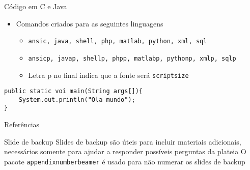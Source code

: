 \documentclass{beamer}
\let\olditem\item
\renewcommand{\item}{%
\olditem\vspace{\fill}}
\begin{document}
\begin{frame}[fragile]{Código em C e Java}

\begin{itemize}
		\item Comandos criados para as seguintes linguagens
		\begin{itemize}
			\item \texttt{ansic, java, shell, php, matlab, python, xml, sql}
			\item \texttt{ansicp, javap, shellp, phpp, matlabp, pythonp, xmlp, sqlp}
			\item Letra p no final indica que a fonte será \texttt{scriptsize}
		\end{itemize}
\end{itemize}



\javap
\begin{lstlisting}
public static voi main(String args[]){
	System.out.println("Ola mundo");
}
\end{lstlisting}		
\end{frame}

    \appendix
    \begin{frame}{Referências}
        \nocite{*}
        
        
    \end{frame}
    
    \begin{frame}{Slide de backup}
        Slides de backup são úteis para incluir materiais adicionais, necessários somente para ajudar a responder possíveis perguntas da plateia
        \vfill
        O pacote \texttt{appendixnumberbeamer} é usado para não numerar os slides de backup
    \end{frame}
\end{document}
